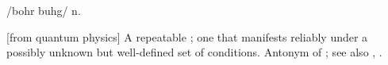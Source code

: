  /bohr buhg/ n.

[from quantum physics] A repeatable ; one that manifests reliably
under a possibly unknown but well-defined set of conditions. Antonym of
; see also , .

